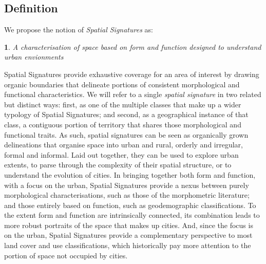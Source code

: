 \subsection{Definition}
\label{ssec:ss_def}

We propose the notion of \textit{Spatial Signatures} as:

\newtheorem*{theorem}{}
\begin{theorem}
A characterisation of space based on form and function designed to understand
urban envionments
\end{theorem}

Spatial Signatures provide exhaustive coverage for an area of interest by
drawing organic boundaries that delineate portions of consistent morphological
and functional characteristics.
%
We will refer to a single \textit{spatial signature} in two related but
distinct ways: first, as one of the multiple classes that make up a wider
typology of Spatial Signatures; and second, as a geographical instance of that
class, a contiguous portion of territory that shares those morphological and
functional traits.
As such, spatial signatures can be seen as organically grown delineations that
organise space into urban and rural, orderly and irregular, formal and informal.
%
Laid out together, they can be used to explore urban extents, to parse through
the complexity of their spatial structure, or to understand the evolution of
cities.
In bringing together both form and function, with a focus on the urban,
Spatial Signatures provide a nexus between purely morphological
characterisations, such as those of the morphometric literature; and those
entirely based on function, such as geodemographic classifications.
%
To the extent form and function are intrinsically connected, its
combination leads to more robust portraits of the space that makes up cities.
And, since the focus is on the urban, Spatial Signatures provide a complementary
perspective to most land cover and use classifications, which historically
pay more attention to the portion of space not occupied by cities.

